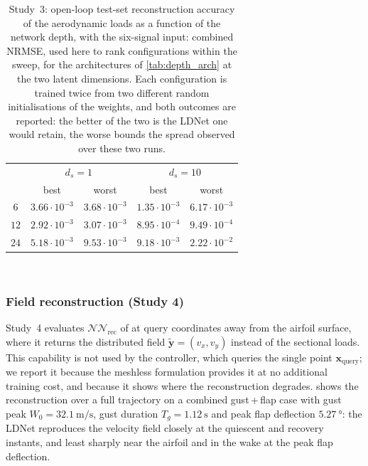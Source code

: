 \begin{table}[t]
\centering
\begin{tabular}{|c|c|c|c|c|}
\hhline{|-|-|-|-|-|}
\rowcolor{bluePoli!40}
\multicolumn{1}{|c|}{} & \multicolumn{2}{c|}{$d_s=1$} & \multicolumn{2}{c|}{$d_s=10$} \T\B \\
\hhline{|~|-|-|-|-|}
\rowcolor{bluePoli!40}
\multicolumn{1}{|c|}{$L$} & \multicolumn{1}{c|}{best} & \multicolumn{1}{c|}{worst} & \multicolumn{1}{c|}{best} & \multicolumn{1}{c|}{worst} \T\B \\
\hhline{|=|=|=|=|=|}
$6$  & $3.66\cdot10^{-3}$ & $3.68\cdot10^{-3}$ & $1.35\cdot10^{-3}$ & $6.17\cdot10^{-3}$ \T\B \\
\hline
$12$ & $2.92\cdot10^{-3}$ & $3.07\cdot10^{-3}$ & $8.95\cdot10^{-4}$ & $9.49\cdot10^{-4}$ \T\B \\
\hline
$24$ & $5.18\cdot10^{-3}$ & $9.53\cdot10^{-3}$ & $9.18\cdot10^{-3}$ & $2.22\cdot10^{-2}$ \B \\
\hline
\end{tabular}
\\[6pt]
\caption{Study~3: open-loop test-set reconstruction accuracy of the aerodynamic loads as a function of the
network depth, with the six-signal input: combined NRMSE, used here to rank configurations
within the sweep, for the architectures of \cref{tab:depth_arch} at the two latent dimensions.
Each configuration is trained twice from two different random initialisations of the weights,
and both outcomes are reported: the better of the two is the LDNet one would retain, the worse
bounds the spread observed over these two runs.}
\label{tab:depth_loads}
\end{table}

\subsubsection{Field reconstruction (Study 4)}
\label{subsubsec:field_recon}

Study~4 evaluates $\mathcal{NN}_\mathrm{rec}$ of  at query
coordinates away from the airfoil surface, where it returns the distributed field
$\widetilde{\mathbf{y}}=(v_x,v_y)$ instead of the sectional loads. This capability is not used
by the controller, which queries the single point $\mathbf{x}_\mathrm{query}$; we report it
because the meshless formulation provides it at no additional training cost, and because it
shows where the reconstruction degrades.  shows the reconstruction over a
full trajectory on a combined gust\,+\,flap case with gust peak
$W_0=\SI{32.1}{\meter\per\second}$, gust duration $T_g=\SI{1.12}{\second}$ and peak flap
deflection $\SI{5.27}{\degree}$: the LDNet reproduces the velocity field closely at the
quiescent and recovery instants, and least sharply near the airfoil and in the wake at the
peak flap deflection.

